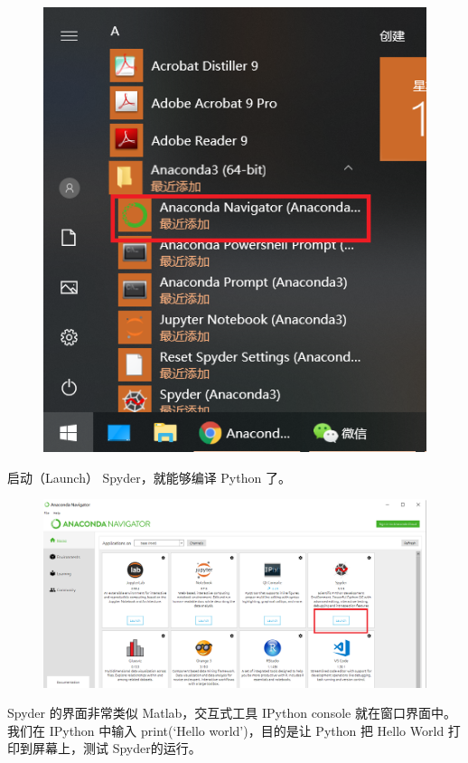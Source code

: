 \begin{figure}[!ht]
  \centering
  \includegraphics[scale=0.5]{figure/chapter1/anaconda11.png}
\end{figure}


启动（Launch） Spyder，就能够编译 Python 了。

\begin{figure}[!ht]
  \centering
  \includegraphics[scale=0.3]{figure/chapter1/anaconda4.png}
\end{figure}


Spyder 的界面非常类似 Matlab，交互式工具 IPython console 就在窗口界面中。我们在 IPython 中输入 print(`Hello world')，目的是让 Python 把 Hello World 打印到屏幕上，测试 Spyder的运行。

